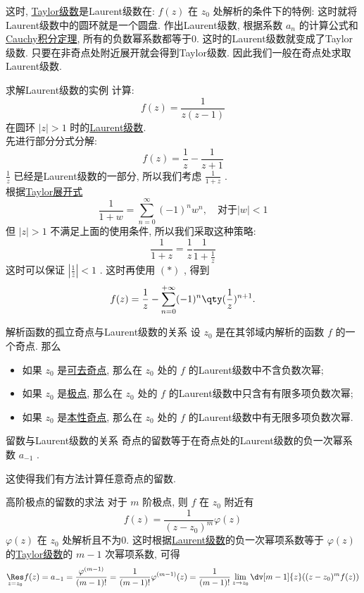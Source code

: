 \documentclass[UTF8]{ctexart}
\newcommand{\CauchyThm}{\hyperref[thm:Cauchy]{Cauchy积分定理}}
\begin{document}
这时, \hyperref[thm:TaylorSeries]{Taylor级数}是Laurent级数在:  \( f(z) \) 在 \( z_0 \) 处解析的条件下的特例: 这时就将Laurent级数中的圆环就是一个圆盘. 作出Laurent级数, 根据系数 \( a_n \) 的计算公式和\CauchyThm , 所有的负数幂系数都等于0. 这时的Laurent级数就变成了Taylor级数. 只要在非奇点处附近展开就会得到Taylor级数. 因此我们一般在奇点处求取Laurent级数. 
\begin{xmp}
    {求解Laurent级数的实例}
    计算: 
    \[f(z)=\frac{1}{z(z-1)}\]
    在圆环 \( |z|>1 \) 时的\hyperref[thm:Laurent]{Laurent级数}.\\
    先进行部分分式分解: 
    \[f(z)=\frac{1}{z}-\frac{1}{z+1}\]
    \( \frac{1}{z} \) 已经是Laurent级数的一部分, 所以我们考虑 \( \frac{1}{1+z} \) .\\
    根据\hyperref[xmp:TaylorCommon]{Taylor展开式}
    \[\frac{1}{1 + w} = \sum_{n=0}^{\infty} (-1)^n w^n, \quad \text{对于} |w| < 1\tag{ \( \ast \) }\]
    但 \( |z|>1 \) 不满足上面的使用条件, 所以我们采取这种策略: 
    \[\frac{1}{1+z}=\frac{1}{z}\frac{1}{1+\frac{1}{z}}\]
    这时可以保证 \( \left\lvert \frac{1}{z}\right\rvert <1 \) . 这时再使用 \( (\ast) \) , 得到
    \[f(z)=\frac{1}{z}-\sum_{n=0}^{+\infty}(-1)^n\qty(\frac{1}{z})^{n+1}.\]
\end{xmp}
\begin{thm}
    {解析函数的孤立奇点与Laurent级数的关系}
    设 \( z_0 \) 是在其邻域内解析的函数 \( f \) 的一个奇点. 那么
    \begin{itemize}
        \item 如果 \( z_0 \) 是\hyperref[dfn:RemovableSingularity]{可去奇点}, 那么在 \( z_0 \) 处的 \( f \) 的Laurent级数中不含负数次幂; 
        \item 如果 \( z_0 \) 是\hyperref[dfn:PolarSingularity]{极点}, 那么在 \( z_0 \) 处的 \( f \) 的Laurent级数中只含有有限多项负数次幂; 
        \item 如果 \( z_0 \) 是\hyperref[dfn:EssentialSingularity]{本性奇点}, 那么在 \( z_0 \) 处的 \( f \) 的Laurent级数中有无限多项负数次幂. 
    \end{itemize}
\end{thm}
\begin{crl}
    {留数与Laurent级数的关系}
    奇点的留数等于在奇点处的Laurent级数的负一次幂系数 \( a_{-1} \) .
\end{crl}
这使得我们有方法计算任意奇点的留数. 
\begin{crl}
    {高阶极点的留数的求法}
    对于 \( m \) 阶极点, 则 \( f \) 在 \( z_0 \) 附近有
    \[f(z)=\frac{1}{(z-z_0)^m}\varphi(z)\]
     \( \varphi(z) \) 在 \( z_0 \) 处解析且不为0. 这时根据\hyperref[thm:Laurent]{Laurent级数}的负一次幂项系数等于 \( \varphi(z) \) 的\hyperref[thm:TaylorSeries]{Taylor级数}的 \( m-1 \) 次幂项系数, 可得
    \[\underset{z=z_0}{\Res}f(z)=a_{-1}=\frac{\varphi^{(m-1)}}{(m-1)!}=\frac{1}{(m-1)!}\varphi^{(m-1)}(z)=\frac{1}{(m-1)!}\lim_{z\to z_0}\dv[m-1]{z}((z-z_0)^mf(z))\]
\end{crl}
\end{document}
